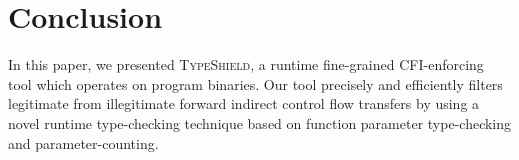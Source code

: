 \section{Conclusion}
\label{chapter:Conclusion}



In this paper, we presented \textsc{TypeShield}, a runtime fine-grained CFI-enforcing tool which 
operates on program binaries. Our tool precisely and efficiently filters legitimate from 
illegitimate forward indirect control flow transfers by using a novel runtime type-checking 
technique based on function parameter type-checking and parameter-counting. 

